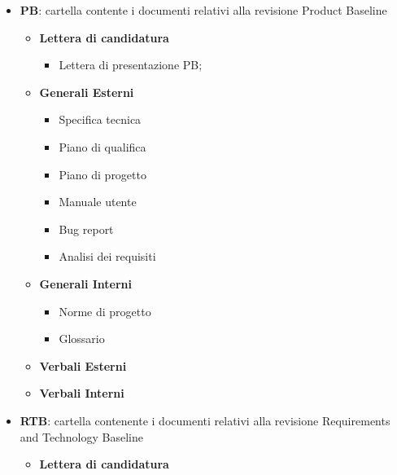         \begin{itemize}
                \item \textbf{PB}: cartella contente i documenti relativi alla revisione Product Baseline
                \begin{itemize}
                        \item \textbf{Lettera di candidatura}
                        \begin{itemize}
                                \item Lettera di presentazione PB;
                        \end{itemize}
                        \item \textbf{Generali Esterni}
                        \begin{itemize}
                                \item Specifica tecnica
                                \item Piano di qualifica
                                \item Piano di progetto
                                \item Manuale utente
                                \item Bug report
                                \item Analisi dei requisiti
                        \end{itemize}
                        \item \textbf{Generali Interni}
                        \begin{itemize}
                                \item Norme di progetto
                                \item Glossario
                        \end{itemize}
                        \item \textbf{Verbali Esterni}
                        \item \textbf{Verbali Interni}
                \end{itemize}
                \pagebreak
                \item \textbf{RTB}: cartella contenente i documenti relativi alla revisione Requirements and Technology Baseline
                \begin{itemize}
                        \item \textbf{Lettera di candidatura}
                        \begin{itemize}

\end{itemize}
\end{itemize}
\end{itemize}
